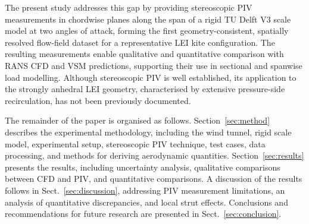 \documentclass[wes, manuscript]{copernicus}
\begin{document}
The present study addresses this gap by providing stereoscopic PIV measurements in chordwise planes along the span of a rigid TU Delft V3 scale model at two angles of attack, forming the first geometry-consistent, spatially resolved flow-field dataset for a representative LEI kite configuration.
The resulting measurements enable qualitative and quantitative comparison with RANS CFD and VSM predictions, supporting their use in sectional and spanwise load modelling.
Although stereoscopic PIV is well established, its application to the strongly anhedral LEI geometry, characterised by extensive pressure-side recirculation, has not been previously documented. 
%

The remainder of the paper is organised as follows. Section~\ref{sec:method} describes the experimental methodology, including the wind tunnel, rigid scale model, experimental setup, stereoscopic PIV technique, test cases, data processing, and methods for deriving aerodynamic quantities. Section~\ref{sec:results} presents the results, including uncertainty analysis, qualitative comparisons between CFD and PIV, and quantitative comparisons. A discussion of the results follows in Sect.~\ref{sec:discussion}, addressing PIV measurement limitations, an analysis of quantitative discrepancies, and local strut effects. Conclusions and recommendations for future research are presented in Sect.~\ref{sec:conclusion}.
\end{document}
